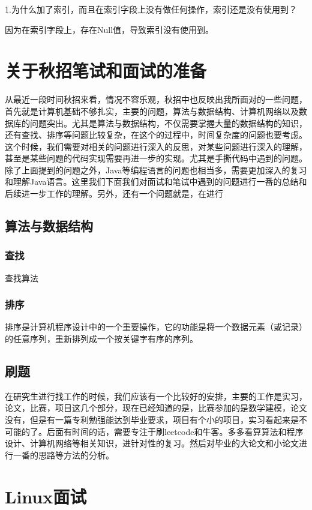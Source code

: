 \documentclass[UTF8]{ctexart}
\begin{document}
1.为什么加了索引，而且在索引字段上没有做任何操作，索引还是没有使用到？

因为在索引字段上，存在Null值，导致索引没有使用到。


\section{关于秋招笔试和面试的准备}
从最近一段时间秋招来看，情况不容乐观，秋招中也反映出我所面对的一些问题，首先就是计算机基础不够扎实，主要的问题，算法与数据结构、计算机网络以及数据库的问题突出。尤其是算法与数据结构，不仅需要掌握大量的数据结构的知识，还有查找、排序等问题比较复杂，在这个的过程中，时间复杂度的问题也要考虑。这个时候，我们需要对相关的问题进行深入的反思，对某些问题进行深入的理解，甚至是某些问题的代码实现需要再进一步的实现。尤其是手撕代码中遇到的问题。除了上面提到的问题之外，Java等编程语言的问题也相当多，需要更加深入的复习和理解Java语言。这里我们下面我们对面试和笔试中遇到的问题进行一番的总结和后续进一步工作的理解。另外，还有一个问题就是，在进行\\
\subsection{算法与数据结构}
\subsubsection{查找}
查找算法

\subsubsection{排序}
排序是计算机程序设计中的一个重要操作，它的功能是将一个数据元素（或记录）的任意序列，重新排列成一个按关键字有序的序列。




\subsection{刷题}
在研究生进行找工作的时候，我们应该有一个比较好的安排，主要的工作是实习，论文，比赛，项目这几个部分，现在已经知道的是，比赛参加的是数学建模，论文没有，但是有一篇专利勉强能达到毕业要求，项目有个小的项目，实习看起来是不可能的了。后面有时间的话，需要专注于刷leetcode和牛客。多多看算算法和程序设计、计算机网络等相关知识，进针对性的复习。然后对毕业的大论文和小论文进行一番的思路等方法的分析。


\section{Linux面试}
\end{document}
